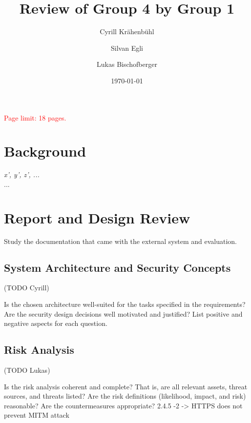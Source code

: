 \documentclass[english]{article}
\title{\huge\sffamily\bfseries Review of Group 4 by Group 1}
\author{Cyrill Kr\"ahenb\"uhl \and Silvan Egli \and Lukas Bischofberger}
\date{\today}
\begin{document}
\maketitle

\begin{center}
{\large\textcolor{red}{Page limit: 18 pages.}}
\end{center}

\tableofcontents
\pagebreak



\section{Background}

 {\it x', y', z', ...} \\

 ...


\section{Report and Design Review}

Study the documentation that came with the external system and evaluation. 

\subsection{System Architecture and Security Concepts} (TODO Cyrill)

Is the chosen architecture well-suited for the tasks specified in the requirements? Are the security design decisions well motivated and justified? List positive and negative aspects for each question.


\subsection{Risk Analysis} (TODO Lukas)

Is the risk analysis coherent and complete? That is, are all relevant assets, threat sources, and threats listed? 
%
Are the risk definitions (likelihood, impact, and risk) reasonable?
%
Are the countermeasures appropriate?
2.4.5 -2 -> HTTPS does not prevent MITM attack
\end{document}
